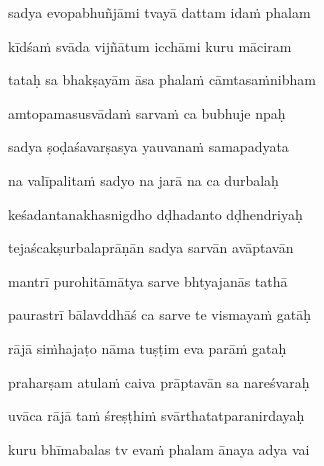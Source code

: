 sadya evopabhuñjāmi tvayā dattam idaṁ phalam\thinspace{\dandab} \dontdisplaylinenum

kīdśaṁ svāda vijñātum icchāmi kuru māciram \veg\dontdisplaylinenum
{}

tataḥ sa bhakṣayām āsa phalaṁ cāmtasaṁnibham\thinspace{\dandab} \dontdisplaylinenum

amtopamasusvādaṁ sarvaṁ ca bubhuje npaḥ \veg\dontdisplaylinenum
{}

sadya ṣoḍaśavarṣasya yauvanaṁ samapadyata\thinspace{\dandab} \dontdisplaylinenum

na valīpalitaṁ sadyo na jarā na ca durbalaḥ \veg\dontdisplaylinenum
{}

keśadantanakhasnigdho dḍhadanto dḍhendriyaḥ\thinspace{\dandab} \dontdisplaylinenum

tejaścakṣurbalaprāṇān sadya sarvān avāptavān \veg\dontdisplaylinenum
{}

mantrī purohitāmātya sarve bhtyajanās tathā\thinspace{\dandab} \dontdisplaylinenum

paurastrī bālavddhāś ca sarve te vismayaṁ gatāḥ \veg\dontdisplaylinenum
{}

rājā siṁhajaṭo nāma tuṣṭim eva parāṁ gataḥ\thinspace{\dandab} \dontdisplaylinenum

praharṣam atulaṁ caiva prāptavān sa nareśvaraḥ \veg\dontdisplaylinenum

uvāca rājā taṁ śreṣṭhiṁ svārthatatparanirdayaḥ\thinspace{\dandab} \dontdisplaylinenum

kuru bhīmabalas tv evaṁ phalam ānaya adya vai \veg\dontdisplaylinenum
{}

